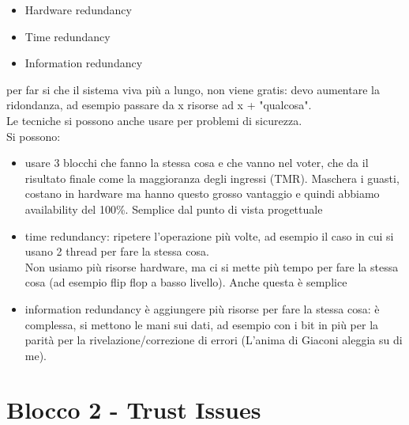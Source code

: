 \documentclass[oneside, 12pt]{extbook}
\begin{document}
\begin{itemize}
	\item Hardware redundancy
	\item Time redundancy
	\item Information redundancy
\end{itemize}
per far si che il sistema viva più a lungo, non viene gratis: devo aumentare la ridondanza, ad esempio passare da x risorse ad x + "qualcosa".\\Le tecniche si possono anche usare per problemi di sicurezza.\\
Si possono:
\begin{itemize}
	\item usare 3 blocchi che fanno la stessa cosa e che vanno nel voter, che da il risultato finale come la maggioranza degli ingressi (TMR). Maschera i guasti, costano in hardware ma hanno questo grosso vantaggio e quindi abbiamo availability del 100\%. Semplice dal punto di vista progettuale
	\item time redundancy: ripetere l'operazione più volte, ad esempio il caso in cui si usano 2 thread per fare la stessa cosa.\\Non usiamo più risorse hardware, ma ci si mette più tempo per fare la stessa cosa (ad esempio flip flop a basso livello). Anche questa è semplice
	\item information redundancy è aggiungere più risorse per fare la stessa cosa: è complessa, si mettono le mani sui dati, ad esempio con i bit in più per la parità per la rivelazione/correzione di errori (L'anima di Giaconi aleggia su di me).
\end{itemize}


\chapter{Blocco 2 - Trust Issues}
\end{document}
